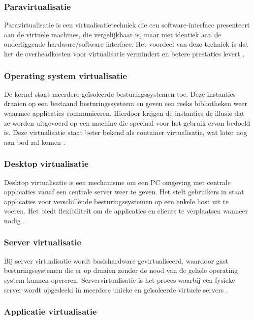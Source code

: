 \subsubsection{Paravirtualisatie}

Paravirtualisatie is een virtualisatietechniek die een software-interface presenteert aan de virtuele machines, die vergelijkbaar is, maar niet identiek aan de onderliggende hardware/software interface. Het voordeel van deze techniek is dat het de overheadkosten voor virtualisatie vermindert en betere prestaties levert \autocite{Kedia2013}.

\subsubsection{Operating system virtualisatie}

De kernel staat meerdere geïsoleerde besturingssystemen toe. Deze instanties draaien op een bestaand besturingssysteem en geven een reeks bibliotheken weer waarmee applicaties communiceren. Hierdoor krijgen de instanties de illusie dat ze worden uitgevoerd op een machine die speciaal voor het gebruik ervan bedoeld is. Deze virtualisatie staat beter bekend als container virtualisatie, wat later nog aan bod zal komen \autocite{Kedia2013}.

\subsubsection{Desktop virtualisatie}

Desktop virtualisatie is een mechanisme om een PC omgeving met centrale applicaties vanaf een centrale server weer te geven. Het stelt gebruikers in staat applicaties voor verschillende besturingssystemen op een enkele host uit te voeren. Het biedt flexibiliteit om de applicaties en clients te verplaatsen wanneer nodig \autocite{Kedia2013}.

\subsubsection{Server virtualisatie}

Bij server virtualisatie wordt basishardware gevirtualiseerd, waardoor gast besturingssystemen die er op draaien zonder de nood van de gehele operating system kunnen opereren. Servervirtualisatie is het proces waarbij een fysieke server wordt opgedeeld in meerdere unieke en geïsoleerde virtuele servers \autocite{Kedia2013}.

\subsubsection{Applicatie virtualisatie}

